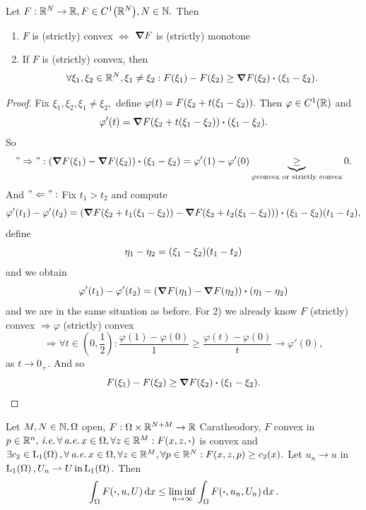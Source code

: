 \documentclass{article}
\begin{document}
\begin{lemma}
	Let $F: {\mathbb R}^N \to {\mathbb R}, F \in C^1\qty({\mathbb R}^N), N \in {\mathbb N}.$ Then 
	\begin{enumerate}
		\item $F$ is (strictly) convex $\Leftrightarrow$ $\grad F$ is (strictly) monotone
		\item If $F$ is (strictly) convex, then
			\[
				\forall \xi_1, \xi_2 \in \R^N, \xi_1 \neq \xi_2: F\qty(\xi_1)-F\qty(\xi_2)\geq \grad F\qty(\xi_2)\vdot \qty(\xi_1 - \xi_2).
			\]
	\end{enumerate}
\end{lemma}
\begin{proof}
	Fix $\xi_1, \xi_2, \xi_1 \neq \xi_2,$ define $\varphi(t) = F\qty(\xi_2 + t\qty(\xi_1 - \xi_2)).$ Then $\varphi \in C^1\qty({\mathbb R})$ and
	\[
		\varphi'(t) = \grad F\qty(\xi_2 +t\qty(\xi_1 - \xi_2))\vdot \qty(\xi_1 - \xi_2).
	\]
	So
	\[
		"\Rightarrow": \qty(\grad F\qty(\xi_1) - \grad F\qty(\xi_2))\vdot\qty(\xi_1-\xi_2) = \varphi'(1)-\varphi'(0) \underbrace{\geq}_{\varphi \text{convex or strictly convex}} 0.
	\]
	And $"\Leftarrow":$ Fix $t_1 > t_2$ and compute
	\[
		\varphi'\qty(t_1) - \varphi'\qty(t_2) = \qty(\grad F\qty(\xi_2 + t_1\qty(\xi_1 - \xi_2))- \grad F\qty(\xi_2 + t_2\qty(\xi_1-\xi_2)))\vdot\qty(\xi_1-\xi_2)\qty(t_1-t_2),
	\]
	define
	\[
		\eta_1 - \eta_2 = \qty(\xi_1 - \xi_2)\qty(t_1-t_2)
	\]
	and we obtain
	\[
		\varphi'(t_1) - \varphi'(t_2) = \qty(\grad F\qty(\eta_1)-\grad F\qty(\eta_2))\vdot \qty(\eta_1 - \eta_2)
	\]
	and we are in the same situation as before. For 2) we already know $F$ (strictly) convex $\Rightarrow \varphi$ (strictly) convex
	\[
		\Rightarrow \forall t \in (0,\frac{1}{2}): \frac{\varphi(1)-\varphi(0)}{1} \geq \frac{\varphi(t)-\varphi(0)}{t}\to \varphi'(0),
	\]
	as $t\to 0_+.$ And so
	\[
		F\qty(\xi_1) - F\qty(\xi_2) \geq \grad F\qty(\xi_2)\vdot \qty(\xi_1 - \xi_2).
	\]
\end{proof}

\begin{theorem}
	Let $M,N \in {\mathbb N}, \Omega$ open, $F: \Omega \times {\mathbb R}^{N+M} \to {\mathbb R}$ Caratheodory, $F$ convex in $p \in \R^{n}, \, \text{\textit{i.e.}} \, \forall \, \text{\textit{a.e.}} \,x \in \Omega, \forall z \in \R^{M}: F\qty(x,z,\vdot)$ is convex and $\exists c_2 \in \LpSet[1]{\Omega}, \forall\, \text{\textit{a.e.}} \, x \in \Omega, \forall z \in \R^{M}, \forall p \in \R^{N}: F\qty(x,z,p)\geq c_2(x).$ Let $u_n \to u$ in $\LpSet[1]{\Omega}, U_n \rightharpoonup U \, \text{in} \, \LpSet[1]{\Omega}.$ Then
	\[
		\int_{\Omega}F\qty(\vdot,u,U)\dd{x} \leq \liminf_{n\to \infty} \int_{\Omega}F\qty(\vdot, u_n, U_n) \dd{x}.
	\]
\end{theorem}
\end{document}
